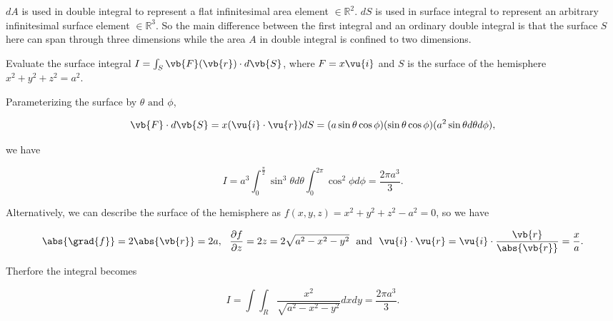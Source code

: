 \documentclass[english,a4paper,12pt]{report}
\begin{document}
\(dA\) is used in double integral to represent a flat infinitesimal area element \(\in \mathbb{R}^2\). \(dS\) is used in surface integral to represent an arbitrary infinitesimal surface element \(\in \mathbb{R}^3 \). So the main difference between the first integral and an ordinary double integral is that the surface \(S\) here can span through three dimensions while the area \(A\) in double integral is confined to two dimensions.


{Evaluate the surface integral \( I = \int_{S}^{} \vb{F}(\vb{r} ) \cdot d\vb{S} \), where \(F = x \vu{i}  \) and \(S\) is the surface of the hemisphere \(x^2 + y^2 + z^2 = a^2\).}
{Parameterizing the surface by \(\theta \text { and } \phi \), 

\begin{equation}
	\vb{F} \cdot d\vb{S}  = x(\vu{i} \cdot \vu{r} )dS = (a \sin \theta \cos \phi )(\sin \theta \cos \phi )(a^2\sin \theta d \theta d\phi ),
\end{equation}

we have 

\begin{equation}
	I = a^3 \int_{0}^{\frac{\pi }{2} } \sin ^3 \theta d \theta \int_{0}^{2\pi } \cos ^2\phi d\phi = \frac{2\pi a^3 }{3}.    
\end{equation}

Alternatively, we can describe the surface of the hemisphere as \(f(x,y,z) = x^2 + y^2 + z^2 - a^2 = 0\), so we have 

\begin{equation}
	\abs{\grad{f} } = 2\abs{\vb{r} } = 2a, ~~ 	\frac{\partial f}{\partial z} = 2z = 2\sqrt{a^2-x^2-y^2} ~\text { and }~ \vu{i} \cdot \vu{r} = \vu{i} \cdot \frac{\vb{r} }{\abs{\vb{r} } } = \frac{x}{a}. 
\end{equation}

Therfore the integral becomes

\begin{equation}
	I = \int \int_{R}^{} \frac{x^2}{\sqrt{a^2-x^2-y^2} }dxdy = \frac{2\pi a^3 }{3}.    
\end{equation}
 } 
 
\end{document}
